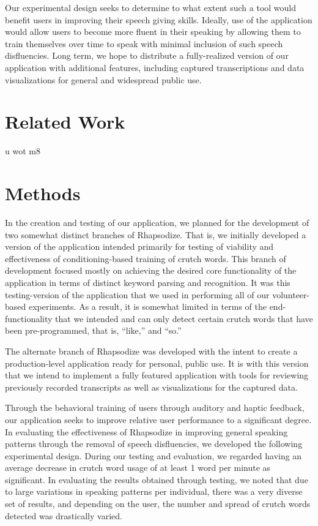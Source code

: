 \documentclass{sigchi}
\begin{document}
Our experimental design seeks to determine to what extent such a tool would benefit users in improving their speech giving skills. Ideally, use of the application would allow users to become more fluent in their speaking by allowing them to train themselves over time to speak with minimal inclusion of such speech disfluencies. Long term, we hope to distribute a fully-realized version of our application with additional features, including captured transcriptions and data visualizations for general and widespread public use.


\section{Related Work}

u wot m8

\section{Methods}

In the creation and testing of our application, we planned for the development of two somewhat distinct branches of Rhapsodize. That is, we initially developed a version of the application intended primarily for testing of viability and effectiveness of conditioning-based training of crutch words. This branch of development focused mostly on achieving the desired core functionality of the application in terms of distinct keyword parsing and recognition. It was this testing-version of the application that we used in performing all of our volunteer-based experiments. As a result, it is somewhat limited in terms of the end-functionality that we intended and can only detect certain crutch words that have been pre-programmed, that is, “like,” and “so.”

The alternate branch of Rhapsodize was developed with the intent to create a production-level application ready for personal, public use. It is with this version that we intend to implement a fully featured application with tools for reviewing previously recorded transcripts as well as visualizations for the captured data.

Through the behavioral training of users through auditory and haptic feedback, our application seeks to improve relative user performance to a significant degree. In evaluating the effectiveness of Rhapsodize in improving general speaking patterns through the removal of speech disfluencies, we developed the following experimental design. During our testing and evaluation, we regarded having an average decrease in crutch word usage of at least 1 word per minute as significant. In evaluating the results obtained through testing, we noted that due to large variations in speaking patterns per individual, there was a very diverse set of results, and depending on the user, the number and spread of crutch words detected was drastically varied.
\end{document}
